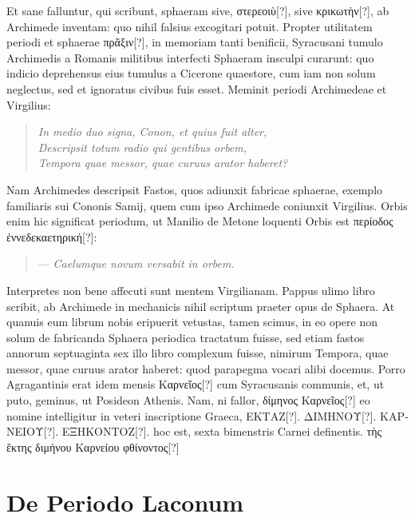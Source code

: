 Et sane falluntur, qui scribunt, sphaeram
sive, \textgreek{στερεοιὺ[?]}, sive \textgreek{κρικωτὴν[?]},
 ab Archimede inventam: quo nihil falsius
excogitari potuit.
Propter utilitatem periodi et sphaerae \textgreek{πρᾶξιν[?]}, in memoriam
tanti benificii, Syracusani tumulo Archimedis a Romanis
militibus interfecti Sphaeram insculpi curarunt: quo indicio deprehensus
eius tumulus a Cicerone quaestore, cum iam non solum neglectus,
sed et ignoratus civibus fuis esset.
Meminit periodi Archimedeae
et Virgilius:
\begin{verse}
  \emph{In medio duo signa, Conon, et quius fuit alter,}\\
  \emph{Descripsit totum radio qui gentibus orbem,}\\
  \emph{Tempora quae messor, quae curuus arator haberet?}
\end{verse}
Nam Archimedes descripsit Fastos, quos adiunxit fabricae sphaerae,
exemplo familiaris sui Cononis Samij, quem cum ipso Archimede
coniunxit Virgilius.
Orbis enim hic significat periodum, ut Manilio
de Metone loquenti Orbis est \textgreek{περίοδος ἐννεδεκαετηρική[?]}:
\begin{verse}
--- \emph{Caelumque novum versabit in orbem.}
\end{verse}
Interpretes non bene affecuti sunt mentem Virgilianam.
Pappus ulimo
libro scribit, ab Archimede in mechanicis nihil scriptum praeter
opus de Sphaera.
At quanuis eum librum nobis eripuerit vetustas, tamen
scimus, in eo opere non solum de fabricanda Sphaera periodica
tractatum fuisse, sed etiam fastos annorum septuaginta sex illo libro
complexum fuisse, nimirum Tempora, quae messor, quae curuus arator
haberet: quod parapegma vocari alibi docemus.
Porro Agragantinis
erat idem mensis \textgreek{Καρνεῖος[?]} cum Syracusanis communis, et, ut
puto, geminus, ut Posideon Athenis.
Nam, ni fallor, \textgreek{δίμηνος Καρνεῖος[?]}
eo nomine intelligitur in veteri inscriptione Graeca, \textgreek{ΕΚΤΑΖ[?]}.
\textgreek{ΔΙΜΗΝΟΥ[?]}. \textgreek{ΚΑΡΝΕΙΟΥ[?]}.
 \textgreek{ΕΞΗΚΟΝΤΟΖ[?]}. hoc est, sexta
bimenstris Carnei definentis.
\textgreek{τὴς ἕκτης διμήνου Καρνείου φθίνοντος[?]}

\section{De Periodo Laconum}

